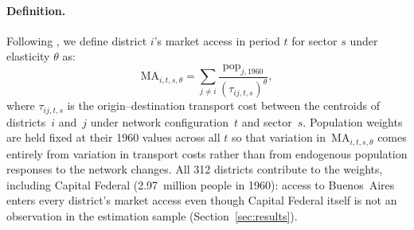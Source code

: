\paragraph{Definition.}
Following \citet{donaldsonhornbeck2016},
we define district $i$'s market access in period $t$ for sector
$s$ under elasticity $\theta$ as:
\begin{equation}
  \mathrm{MA}_{i,t,s,\theta} = \sum_{j \neq i}
     \frac{\mathrm{pop}_{j,1960}}{(\tau_{ij,t,s})^{\theta}},
  \label{eq:ma}
\end{equation}
where $\tau_{ij,t,s}$ is the origin--destination transport cost between
the centroids of districts~$i$ and~$j$ under network configuration~$t$
and sector~$s$. Population weights are held fixed at their 1960 values
across all $t$ so that variation in~$\mathrm{MA}_{i,t,s,\theta}$ comes
entirely from variation in transport costs rather than from endogenous
population responses to the network changes. All 312 districts
contribute to the weights, including Capital Federal
(2.97~million people in 1960): access to Buenos~Aires enters every
district's market access even though Capital Federal itself is not an
observation in the estimation sample (Section~\ref{sec:results}).

